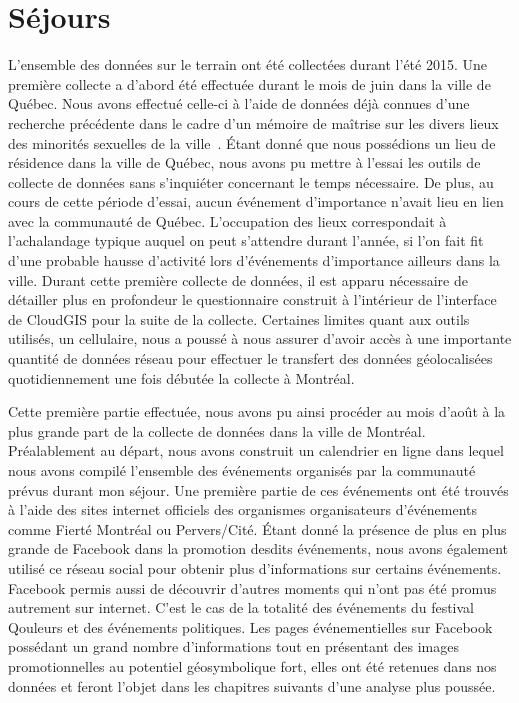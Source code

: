 \section{Séjours}
\label{sec:s_jours}
L'ensemble des données sur le terrain ont été collectées durant l'été 2015. 
Une première collecte a d'abord été effectuée durant le mois de juin dans la ville de Québec. 
Nous avons effectué celle-ci à l'aide de données déjà connues d'une recherche précédente dans le cadre d'un mémoire de maîtrise sur les divers lieux des minorités sexuelles de la ville~\citep{Vachon2014}. 
Étant donné que nous possédions un lieu de résidence dans la ville de Québec, nous avons pu mettre à l'essai les outils de collecte de données sans s'inquiéter concernant le temps nécessaire. 
De plus, au cours de cette période d'essai, aucun événement d'importance n'avait lieu en lien avec la communauté \lgbt{} de Québec. 
L'occupation des lieux correspondait à l'achalandage typique auquel on peut s'attendre durant l'année, si l'on fait fit d'une probable hausse d'activité lors d'événements d'importance ailleurs dans la ville. 
Durant cette première collecte de données, il est apparu nécessaire de détailler plus en profondeur le questionnaire construit à l'intérieur de l'interface de CloudGIS pour la suite de la collecte. 
Certaines limites quant aux outils utilisés, un cellulaire, nous a poussé à nous assurer d'avoir accès à une importante quantité de données réseau pour effectuer le transfert des données géolocalisées quotidiennement une fois débutée la collecte à Montréal.

Cette première partie effectuée, nous avons pu ainsi procéder au mois d'août à la plus grande part de la collecte de données dans la ville de Montréal.
Préalablement au départ, nous avons construit un calendrier en ligne dans lequel nous avons compilé l'ensemble des événements organisés par la communauté \lgbt{} prévus durant mon séjour. 
Une première partie de ces événements ont été trouvés à l'aide des sites internet officiels des organismes organisateurs d'événements comme Fierté Montréal ou Pervers/Cité. 
Étant donné la présence de plus en plus grande de Facebook dans la promotion desdits événements, nous avons également utilisé ce réseau social pour obtenir plus d'informations sur certains événements. 
Facebook permis aussi de découvrir d'autres moments qui n'ont pas été promus autrement sur  internet. 
C'est le cas de la totalité des événements du festival Qouleurs et des événements politiques. 
Les pages événementielles sur Facebook possédant un grand nombre d'informations tout en présentant des images promotionnelles au potentiel géosymbolique fort, elles ont été retenues dans nos données et feront l'objet dans les chapitres suivants d'une analyse plus poussée.

